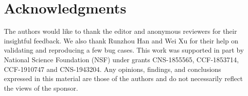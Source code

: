 \section*{Acknowledgments}
The authors would like to thank  the editor and
anonymous reviewers 
for their insightful feedback.  
We also thank Runzhou Han and Wei Xu for their help on validating and reproducing a few bug cases. This work was supported in part by National Science Foundation (NSF) under grants CNS-1855565, CCF-1853714, CCF-1910747  and CNS-1943204. Any opinions, findings, and conclusions expressed in this material are those of the authors and do not necessarily reflect the views of the sponsor. 